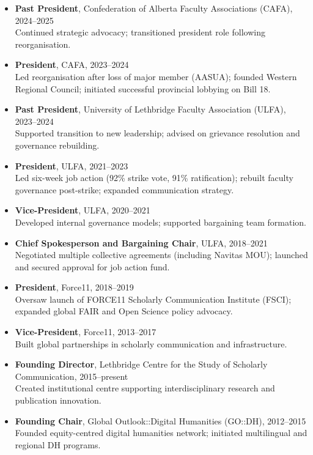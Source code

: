\documentclass[12pt]{article}
\begin{document}
\begin{itemize}
  \item \textbf{Past President}, Confederation of Alberta Faculty Associations (CAFA), 2024–2025\\
  Continued strategic advocacy; transitioned president role following reorganisation.
  \item \textbf{President}, CAFA, 2023–2024\\
  Led reorganisation after loss of major member (AASUA); founded Western Regional Council; initiated successful provincial lobbying on Bill 18.
  \item \textbf{Past President}, University of Lethbridge Faculty Association (ULFA), 2023–2024\\
  Supported transition to new leadership; advised on grievance resolution and governance rebuilding.
  \item \textbf{President}, ULFA, 2021–2023\\
  Led six-week job action (92\% strike vote, 91\% ratification); rebuilt faculty governance post-strike; expanded communication strategy.
  \item \textbf{Vice-President}, ULFA, 2020–2021\\
  Developed internal governance models; supported bargaining team formation.
  \item \textbf{Chief Spokesperson and Bargaining Chair}, ULFA, 2018–2021\\
  Negotiated multiple collective agreements (including Navitas MOU); launched and secured approval for job action fund.
  \item \textbf{President}, Force11, 2018–2019\\
  Oversaw launch of FORCE11 Scholarly Communication Institute (FSCI); expanded global FAIR and Open Science policy advocacy.
  \item \textbf{Vice-President}, Force11, 2013–2017\\
  Built global partnerships in scholarly communication and infrastructure.
  \item \textbf{Founding Director}, Lethbridge Centre for the Study of Scholarly Communication, 2015–present\\
  Created institutional centre supporting interdisciplinary research and publication innovation.
  \item \textbf{Founding Chair}, Global Outlook::Digital Humanities (GO::DH), 2012–2015\\
  Founded equity-centred digital humanities network; initiated multilingual and regional DH programs.

\end{itemize}
\end{document}
